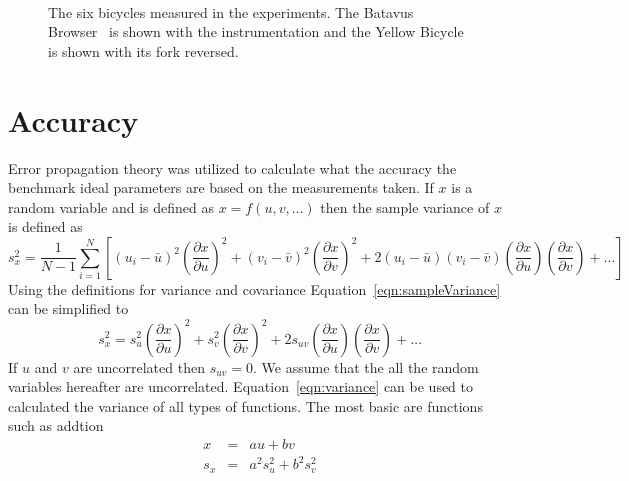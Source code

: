 \documentclass{bmd2010p}
\begin{document}
\begin{figure}[htbp]
    \centering
        \\
    \caption{The six bicycles measured in the experiments. The Batavus
    Browser~ is shown with the instrumentation and the
    Yellow Bicycle~ is shown with its fork reversed.}
    \label{fig:bicycles}
\end{figure}
\section{Accuracy}
Error propagation theory was utilized to calculate what the accuracy the
benchmark ideal parameters are based on the measurements taken. If $x$ is a
random variable and is defined as $x=f(u,v,\ldots)$ then the sample variance of
$x$ is defined as
\begin{equation}
    s_x^2 = \frac{1}{N-1}\sum^N_{i=1}
    \left[(u_i - \bar{u})^2\left(\frac{\partial x}{\partial u}\right)^2 +
    (v_i - \bar{v})^2\left(\frac{\partial x}{\partial v}\right)^2 +
    2(u_i - \bar{u})(v_i - \bar{v})\left(\frac{\partial x}{\partial u}\right)\left(\frac{\partial x}{\partial v}\right)
    + \ldots\right]
    \label{eqn:sampleVariance}
\end{equation}
Using the definitions for variance and covariance
Equation~\ref{eqn:sampleVariance} can be simplified to
\begin{equation}
    s_x^2 = s_u^2\left(\frac{\partial x}{\partial u}\right)^2 +
            s_v^2\left(\frac{\partial x}{\partial v}\right)^2 +
            2s_{uv}\left(\frac{\partial x}{\partial u}\right)\left(\frac{\partial x}{\partial v}\right)
            + \ldots
    \label{eqn:variance}
\end{equation}
If $u$ and $v$ are uncorrelated then $s_{uv}=0$. We assume that the all the
random variables hereafter are uncorrelated. Equation~\ref{eqn:variance} can be
used to calculated the variance of all types of functions. The most basic are
functions such as addtion
\begin{eqnarray}
    \label{eqn:addition}
    x &=&  au + bv\\
    s_x &=& a^2s_u^2 + b^2s_v^2
\end{eqnarray}
\end{document}
